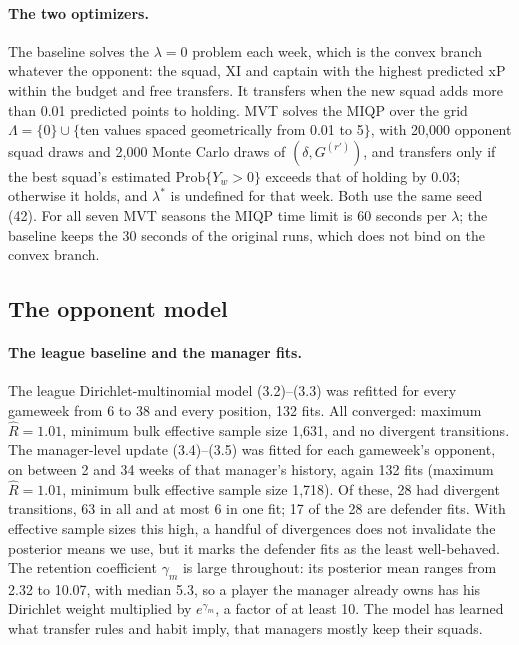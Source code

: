 \paragraph{The two optimizers.} The baseline solves the $\lambda=0$ problem each week, which is
the convex branch whatever the opponent: the squad, XI and captain with the highest predicted
xP within the budget and free transfers. It transfers when the new squad adds more than 0.01
predicted points to holding. MVT solves the MIQP over the grid $\Lambda=\{0\}\cup\{$ten values
spaced geometrically from 0.01 to 5$\}$, with 20{,}000 opponent squad draws and 2{,}000 Monte
Carlo draws of $(\delta,G^{(r')})$, and transfers only if the best squad's estimated
$\mathrm{Prob}\{Y_w>0\}$ exceeds that of holding by 0.03; otherwise it holds, and $\lambda^*$
is undefined for that week. Both use the same seed (42). For all seven MVT seasons the MIQP time
limit is 60 seconds per $\lambda$; the baseline keeps the 30 seconds of the original runs, which
does not bind on the convex branch.

\subsection{The opponent model}
\label{sec:s2-opponent}

\paragraph{The league baseline and the manager fits.} The league Dirichlet-multinomial model
(3.2)--(3.3) was refitted for every gameweek from 6 to 38 and every position, 132 fits. All
converged: maximum $\hat R=1.01$, minimum bulk effective sample size 1{,}631, and no divergent
transitions. The manager-level update (3.4)--(3.5) was fitted for each gameweek's opponent, on
between 2 and 34 weeks of that manager's history, again 132 fits (maximum $\hat R=1.01$, minimum
bulk effective sample size 1{,}718). Of these, 28 had divergent transitions, 63 in all and at
most 6 in one fit; 17 of the 28 are defender fits. With effective sample sizes this high, a
handful of divergences does not invalidate the posterior means we use, but it marks the
defender fits as the least well-behaved.
The retention coefficient $\gamma_m$ is large throughout: its posterior mean ranges from 2.32 to
10.07, with median 5.3, so a player the manager already owns has his Dirichlet weight
multiplied by $e^{\gamma_m}$, a factor of at least 10. The model has learned what transfer rules
and habit imply, that managers mostly keep their squads.

